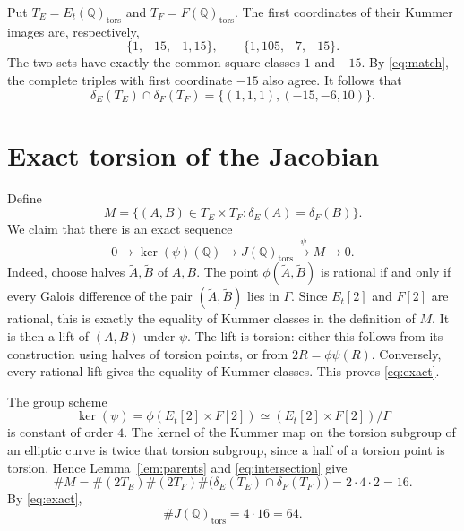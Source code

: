 \documentclass[11pt]{article}
\newcommand{\Q}{\mathbb Q}
\newcommand{\tors}{\mathrm{tors}}
\begin{document}
Put \(T_E=E_t(\Q)_{\tors}\) and \(T_F=F(\Q)_{\tors}\).
The first coordinates of their Kummer images are, respectively,
\[
 \{1,-15,-1,15\},\qquad \{1,105,-7,-15\}.
\]
The two sets have exactly the common square classes \(1\) and \(-15\).
By \eqref{eq:match}, the complete triples with first coordinate
\(-15\) also agree. It follows that
\begin{equation}\label{eq:intersection}
 \delta_E(T_E)\cap\delta_F(T_F)
       =\{(1,1,1),(-15,-6,10)\}.
\end{equation}

\section{Exact torsion of the Jacobian}

Define
\[
 M=\{(A,B)\in T_E\times T_F:\delta_E(A)=\delta_F(B)\}.
\]
We claim that there is an exact sequence
\begin{equation}\label{eq:exact}
 0\longrightarrow\ker(\psi)(\Q)
 \longrightarrow J(\Q)_{\tors}
 \xrightarrow{\ \psi\ }M\longrightarrow0.
\end{equation}
Indeed, choose halves \(\widetilde A,\widetilde B\) of \(A,B\).
The point \(\phi(\widetilde A,\widetilde B)\) is rational if and only if
every Galois difference of the pair \((\widetilde A,\widetilde B)\)
lies in \(\Gamma\).
Since \(E_t[2]\) and \(F[2]\) are rational, this is exactly the equality
of Kummer classes in the definition of \(M\).
It is then a lift of \((A,B)\) under \(\psi\).
The lift is torsion: either this follows from its construction using
halves of torsion points, or from \(2R=\phi\psi(R)\).
Conversely, every rational lift gives the equality of Kummer classes.
This proves \eqref{eq:exact}.

The group scheme
\[
 \ker(\psi)=\phi(E_t[2]\times F[2])
       \simeq(E_t[2]\times F[2])/\Gamma
\]
is constant of order \(4\).
The kernel of the Kummer map on the torsion subgroup of an elliptic
curve is twice that torsion subgroup, since a half of a torsion point
is torsion.
Hence Lemma~\ref{lem:parents} and \eqref{eq:intersection} give
\[
 \#M=\#(2T_E)\#(2T_F)
       \#\bigl(\delta_E(T_E)\cap\delta_F(T_F)\bigr)
      =2\cdot4\cdot2=16.
\]
By \eqref{eq:exact},
\begin{equation}\label{eq:order}
 \#J(\Q)_{\tors}=4\cdot16=64.
\end{equation}
\end{document}
